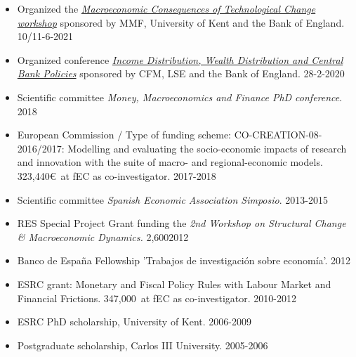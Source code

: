 \documentclass[margin, 11pt]{res} %
\begin{document}
\begin{resume}
\begin{itemize}
\item Organized the  \emph{\href{https://www.bankofengland.co.uk/events/2021/may/mmf-workshop-on-macroeconomic-consequences-of-technological-change}{Macroeconomic Consequences of Technological Change workshop}} sponsored by MMF, University of Kent and the Bank of England. \hfill 10/11-6-2021
\item Organized conference \emph{\href{https://www.dropbox.com/s/vfv3qz5ixi32ywf/Programme.pdf?dl=0}{Income Distribution, Wealth Distribution and Central Bank Policies}} sponsored by CFM, LSE and the Bank of England. \hfill 28-2-2020
\item Scientific committee \emph{Money, Macroeconomics and Finance PhD conference}. \hfill 2018
\item European Commission / Type of funding scheme: CO-CREATION-08-2016/2017: Modelling and evaluating the socio-economic impacts of research and innovation with the suite of macro- and regional-economic models. 323,440\euro$\,$  at fEC  as co-investigator. \hfill 2017-2018
\item Scientific committee \emph{Spanish Economic Association Simposio}. \hfill 2013-2015
\item RES Special Project Grant funding the \emph{2nd Workshop on Structural Change \& Macroeconomic Dynamics.} 2,600\textsterling \hfill 2012
\item Banco de Espa\~{n}a Fellowship 'Trabajos de investigaci\'{o}n sobre econom\'{i}a'. \hfill 2012
\item ESRC grant: Monetary and Fiscal Policy Rules with Labour Market and Financial Frictions. 347,000\textsterling$\,$  at fEC  as co-investigator. \hfill 2010-2012 
\item ESRC PhD scholarship, University of Kent. \hfill 2006-2009
\item Postgraduate scholarship, Carlos III University. \hfill 2005-2006
\end{itemize}



\end{resume}
\end{document}
